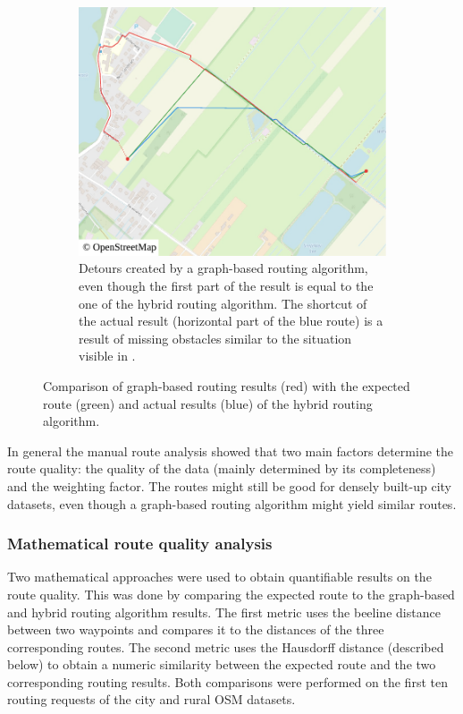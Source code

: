 \begin{figure}[h!]
\begin{minipage}[t]{.48\textwidth}
\begin{subfigure}[t]{\linewidth}
						\includegraphics[width=\textwidth]{images/qgis-routing-rural-routing-17-graph-based}
						\caption{Detours created by a graph-based routing algorithm, even though the first part of the result is equal to the one of the hybrid routing algorithm. The shortcut of the actual result (horizontal part of the blue route) is a result of missing obstacles similar to the situation visible in .}
						\label{fig:eval-rural-graph-based-comparison-17}
					\end{subfigure}
				\end{minipage}
				\caption[Visualization of the detour of graph-based routes.]{Comparison of graph-based routing results (red) with the expected route (green) and actual results (blue) of the hybrid routing algorithm.}
				\label{fig:eval-rural-graph-based-comparison}
			\end{figure}
			
			In general the manual route analysis showed that two main factors determine the route quality:
			the quality of the data (mainly determined by its completeness) and the weighting factor.
			The routes might still be good for densely built-up city datasets, even though a graph-based routing algorithm might yield similar routes.
		
		\subsubsection{Mathematical route quality analysis}
		
			Two mathematical approaches were used to obtain quantifiable results on the route quality.
			This was done by comparing the expected route to the graph-based and hybrid routing algorithm results.
			The first metric uses the beeline distance between two waypoints and compares it to the distances of the three corresponding routes.
			The second metric uses the Hausdorff distance (described below) to obtain a numeric similarity between the expected route and the two corresponding routing results.
			Both comparisons were performed on the first ten routing requests of the city and rural OSM datasets.
			
